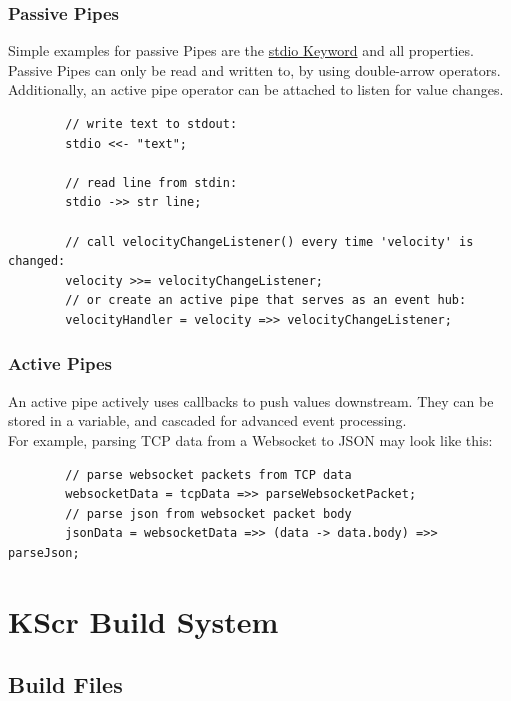 \documentclass{docs}
\begin{document}
    \subsubsection{Passive Pipes}
    Simple examples for passive Pipes are the \hyperref[litStdio]{stdio Keyword} and all properties. \\
    Passive Pipes can only be read and written to, by using double-arrow operators. \\
    Additionally, an active pipe operator can be attached to listen for value changes.
    \begin{verbatim}
        // write text to stdout:
        stdio <<- "text";

        // read line from stdin:
        stdio ->> str line;
        
        // call velocityChangeListener() every time 'velocity' is changed:
        velocity >>= velocityChangeListener;
        // or create an active pipe that serves as an event hub:
        velocityHandler = velocity =>> velocityChangeListener;
    \end{verbatim}

    \subsubsection{Active Pipes}
    An active pipe actively uses callbacks to push values downstream.
    They can be stored in a variable, and cascaded for advanced event processing.
    \\
    For example, parsing TCP data from a Websocket to JSON may look like this:
    \begin{verbatim}
        // parse websocket packets from TCP data
        websocketData = tcpData =>> parseWebsocketPacket;
        // parse json from websocket packet body
        jsonData = websocketData =>> (data -> data.body) =>> parseJson;
    \end{verbatim}

    \pagebreak
    \section{KScr Build System}

    \subsection{Build Files}
\end{document}
